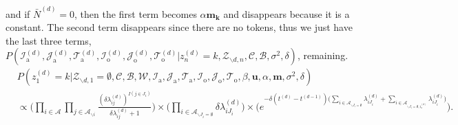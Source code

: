 \documentclass[a4paper]{article}
\begin{document}
 and if $\bar N^{(d)} = 0$, then the first term becomes $\alpha\boldsymbol{m_k}$ and disappears because it is a constant. The second term disappears since there are no tokens, thus we just have the last three terms, $P(\mathcal{I}^{(d)}_{\mbox{a}}, \mathcal{J}^{(d)}_{\mbox{a}}, \mathcal{T}^{(d)}_{\mbox{a}}, \mathcal{I}^{(d)}_{\mbox{o}}, \mathcal{J}^{(d)}_{\mbox{o}}, \mathcal{T}^{(d)}_{\mbox{o}}| z^{(d)}_n=k, \mathcal{Z}_{\backslash d, n}, \mathcal{C}, \mathcal{B}, \sigma^2, \delta)$, remaining.
  \begin{equation}
  \begin{aligned}
  &P(z^{(d)}_1=k|\mathcal{Z}_{\backslash d, 1}=\emptyset,   \mathcal{C},   \mathcal{B},\mathcal{W}, \mathcal{I}_{\mbox{a}}, \mathcal{J}_{\mbox{a}}, \mathcal{T}_{\mbox{a}}, \mathcal{I}_{\mbox{o}}, \mathcal{J}_{\mbox{o}}, \mathcal{T}_{\mbox{o}}, \beta, \boldsymbol{u}, \alpha, \boldsymbol{m}, \sigma^2,  \delta)\\&\propto\Big(\prod_{i\in \mathcal{A}}\prod_{j \in \mathcal{A}_{\backslash i }} \frac{(\delta\lambda^{(d)}_{ij})^{I(j \in J_i)}}{\delta\lambda^{(d)}_{ij}+1}\Big)\times \Big(\prod_{i\in \mathcal{A}_{\backslash J_i=\emptyset}} \delta\lambda^{(d)}_{iJ_i}\Big) \times \Big(e^{-\delta(t^{(d)}-t^{(d-1)})\big(\sum\limits_{i \in \mathcal{A}_{\backslash J_i=\emptyset}}\lambda^{(d)}_{i{J_i}}+\sum\limits_{i \in \mathcal{A}_{\backslash J_i=\emptyset, i_o^{(d)}}}\lambda^{(d)}_{i{J_i}}\big)}\Big).
  \end{aligned}
  \end{equation}
\end{document}
